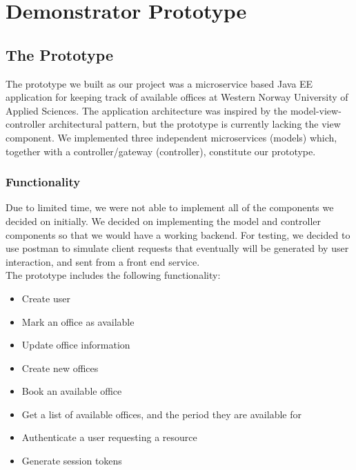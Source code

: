 \section{Demonstrator Prototype}
\label{sec:prototype}

\subsection{The Prototype}
The prototype we built as our project was a microservice based Java EE application for keeping track of available offices at Western Norway University of Applied Sciences. The application architecture was inspired by the model-view-controller architectural pattern, but the prototype is currently lacking the view component. We implemented three independent microservices (models) which, together with a controller/gateway (controller), constitute our prototype. 

\subsubsection{Functionality}
Due to limited time, we were not able to implement all of the components we decided on initially. We decided on implementing the model and controller components so that we would have a working backend. For testing, we decided to use postman to simulate client requests that eventually will be generated by user interaction, and sent from a front end service.  \\
\newline
The prototype includes the following functionality:
\begin{itemize}
    \item Create user
    \item Mark an office as available
    \item Update office information
    \item Create new offices
    \item Book an available office
    \item Get a list of available offices, and the period they are available for
    \item Authenticate a user requesting a resource
    \item Generate session tokens
\end{itemize}

